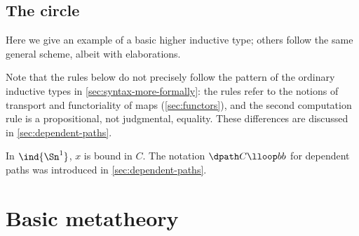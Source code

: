 \subsection{The circle}

%

Here we give an example of a basic higher inductive type; others follow the same
general scheme, albeit with elaborations.

Note that the rules below do not precisely follow the pattern of the ordinary
inductive types in \cref{sec:syntax-more-formally}: the rules refer to the
notions of transport and functoriality of maps (\cref{sec:functors}), and the
second computation rule is a propositional, not judgmental, equality. These
differences are discussed in \cref{sec:dependent-paths}.

%
In $\ind{\Sn^1}$, $x$ is bound in $C$. The notation ${\dpath C \lloop b b}$ for dependent paths was introduced in \cref{sec:dependent-paths}.
%

\section{Basic metatheory}
%

